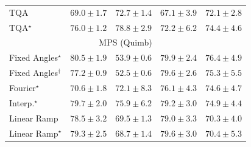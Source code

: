 \begin{tabular}{l|cccc|}
TQA & {\cellcolor[HTML]{91A1CC}} \color[HTML]{F1F1F1} $69.0\pm 1.7$ & {\cellcolor[HTML]{8C7EBA}} \color[HTML]{F1F1F1} $72.7\pm 1.4$ & {\cellcolor[HTML]{99B2D5}} \color[HTML]{000000} $67.1\pm 3.9$ & {\cellcolor[HTML]{8C85BE}} \color[HTML]{F1F1F1} $72.1\pm 2.8$ \\
TQA$^\star$ & {\cellcolor[HTML]{8B60AC}} \color[HTML]{F1F1F1} $76.0\pm 1.2$ & {\cellcolor[HTML]{88449E}} \color[HTML]{F1F1F1} $78.8\pm 2.9$ & {\cellcolor[HTML]{8C84BD}} \color[HTML]{F1F1F1} $72.2\pm 6.2$ & {\cellcolor[HTML]{8C6EB3}} \color[HTML]{F1F1F1} $74.4\pm 4.6$ \\
\cline{1-5}
\multicolumn{5}{c}{\rule{0pt}{8pt}MPS (Quimb)} \\
\midrule
Fixed Angles$^\star$ & {\cellcolor[HTML]{BC4503}} \color[HTML]{F1F1F1} $80.5\pm 1.9$ & {\cellcolor[HTML]{FFFCD8}} \color[HTML]{000000} $53.9\pm 0.6$ & {\cellcolor[HTML]{C34802}} \color[HTML]{F1F1F1} $79.9\pm 2.4$ & {\cellcolor[HTML]{E0630D}} \color[HTML]{F1F1F1} $76.4\pm 4.9$ \\
Fixed Angles$^\dagger$ & {\cellcolor[HTML]{DA5C0A}} \color[HTML]{F1F1F1} $77.2\pm 0.9$ & {\cellcolor[HTML]{FFFFE5}} \color[HTML]{000000} $52.5\pm 0.6$ & {\cellcolor[HTML]{C84A02}} \color[HTML]{F1F1F1} $79.6\pm 2.6$ & {\cellcolor[HTML]{E86C12}} \color[HTML]{F1F1F1} $75.3\pm 5.5$ \\
Fourier$^\star$ & {\cellcolor[HTML]{FD9627}} \color[HTML]{000000} $70.6\pm 1.8$ & {\cellcolor[HTML]{F78921}} \color[HTML]{F1F1F1} $72.1\pm 8.3$ & {\cellcolor[HTML]{E2650F}} \color[HTML]{F1F1F1} $76.1\pm 4.3$ & {\cellcolor[HTML]{ED7215}} \color[HTML]{F1F1F1} $74.6\pm 4.7$ \\
Interp.$^\star$ & {\cellcolor[HTML]{C64902}} \color[HTML]{F1F1F1} $79.7\pm 2.0$ & {\cellcolor[HTML]{E3660F}} \color[HTML]{F1F1F1} $75.9\pm 6.2$ & {\cellcolor[HTML]{CB4B02}} \color[HTML]{F1F1F1} $79.2\pm 3.0$ & {\cellcolor[HTML]{EA6E13}} \color[HTML]{F1F1F1} $74.9\pm 4.4$ \\
Linear Ramp & {\cellcolor[HTML]{D15205}} \color[HTML]{F1F1F1} $78.5\pm 3.2$ & {\cellcolor[HTML]{FEA030}} \color[HTML]{000000} $69.5\pm 1.3$ & {\cellcolor[HTML]{CD4D03}} \color[HTML]{F1F1F1} $79.0\pm 3.3$ & {\cellcolor[HTML]{FE9829}} \color[HTML]{000000} $70.3\pm 4.0$ \\
Linear Ramp$^\star$ & {\cellcolor[HTML]{CB4B02}} \color[HTML]{F1F1F1} $79.3\pm 2.5$ & {\cellcolor[HTML]{FEA937}} \color[HTML]{000000} $68.7\pm 1.4$ & {\cellcolor[HTML]{C84A02}} \color[HTML]{F1F1F1} $79.6\pm 3.0$ & {\cellcolor[HTML]{FE9829}} \color[HTML]{000000} $70.4\pm 5.3$ \\

\end{tabular}
